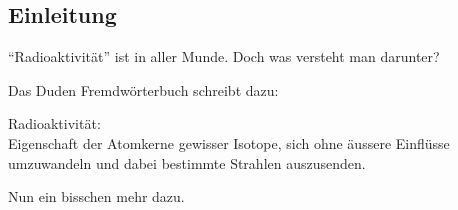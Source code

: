 \documentclass[12pt,a4paper,twoside]{article}
\begin{document}
%
%
%
%
%
%
%
%
%



%
%
%
\subsection*{Einleitung}


``Radioaktivität'' ist in aller Munde. Doch was versteht man darunter?

Das Duden Fremdwörterbuch schreibt dazu:
\begin{cbox}
Radioaktivität:\\
Eigenschaft der Atomkerne gewisser Isotope, sich ohne äussere Einflüsse umzuwandeln und dabei bestimmte Strahlen auszusenden.
\end{cbox}

Nun ein bisschen mehr dazu.
\end{document}

